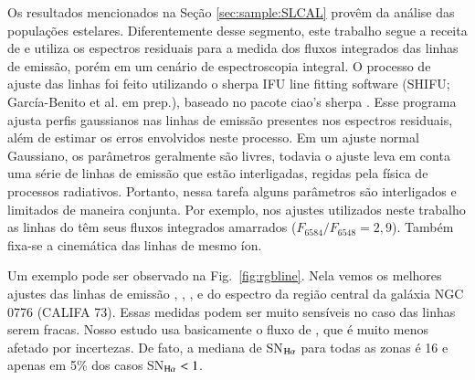 Os resultados mencionados na Seção \ref{sec:sample:SLCAL} provêm da análise das populações estelares. Diferentemente desse segmento, este trabalho segue a receita de \citet{Asari.etal.2007a} e utiliza os espectros residuais para a medida dos fluxos integrados das linhas de emissão, porém em um cenário de espectroscopia integral. O processo de ajuste das linhas foi feito utilizando o {\sc sherpa} IFU line fitting software (SHIFU; García-Benito et al. em prep.), baseado no pacote {\sc ciao's sherpa} \citep{Freeman.etal.2001, Doe.etal.2007}. Esse programa ajusta perfis gaussianos nas linhas de emissão presentes nos espectros residuais, além de estimar os erros envolvidos neste processo. Em um ajuste normal Gaussiano, os parâmetros geralmente são livres, todavia o ajuste leva em conta uma série de linhas de emissão que estão interligadas, regidas pela física de processos radiativos. Portanto, nessa tarefa alguns parâmetros são interligados e limitados de maneira conjunta. Por exemplo, nos ajustes utilizados neste trabalho as linhas do \nii têm seus fluxos integrados amarrados ($F_{6584}/F_{6548} = 2,9$). Também fixa-se a cinemática das linhas de mesmo íon.

Um exemplo pode ser observado na Fig.\ \ref{fig:rgbline}. Nela vemos os melhores ajustes das linhas de emissão \Hb, \oiii, \nii, \Ha e \sii do espectro da região central da galáxia NGC 0776 (CALIFA 73). Essas medidas podem ser muito sensíveis no caso das linhas serem fracas. Nosso estudo usa basicamente o fluxo de \Ha, que é muito menos afetado por incertezas. De fato, a mediana de SN$_{\Ha}$ para todas as zonas é 16 e apenas em 5\% dos casos SN$_{\Ha} < 1$.

\section{\emldc}
\label{sec:sample:emldc}

